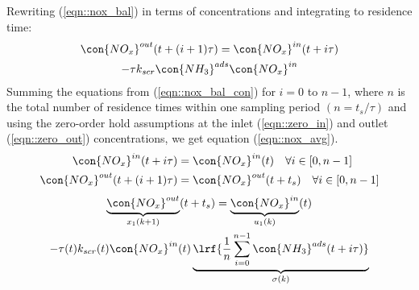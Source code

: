 Rewriting (\ref{eqn::nox_bal}) in terms of concentrations and integrating to residence time:
\begin{multline}
        \con{NO_x}^{out} (t + (i+1) \tau) =
                \con{NO_x}^{in} (t + i \tau) \\
                -\tau k_{scr} \con{NH_3}^{ads} \con{NO_x}^{in}
        \label{eqn::nox_bal_con}
\end{multline}
Summing the equations from (\ref{eqn::nox_bal_con}) for  $i = 0$ to $n-1$, where $n$ is the total number of residence times within one sampling period $(n= t_s/\tau)$ and using the zero-order hold assumptions at the inlet (\ref{eqn::zero_in}) and outlet (\ref{eqn::zero_out}) concentrations, we get equation (\ref{eqn::nox_avg}).
\begin{align}
    \con{NO_x}^{in} (t + i \tau) &= \con{NO_x}^{in}(t) \quad \forall i \in [0, n-1]  \label{eqn::zero_in}\\
    \con{NO_x}^{out} (t + (i+1) \tau) &= \con{NO_x}^{out}(t + t_s) \quad \forall i \in [0, n-1] \label{eqn::zero_out}
\end{align}
\begin{multline}
        \underbrace{\con{NO_x}^{out}}_{x_1(k+1)}(t+t_s) =
                \underbrace{\con{NO_x}^{in}}_{u_1(k)}(t) \\
                - \tau(t) k_{scr}(t) \con{NO_x}^{in}(t) \underbrace{\lrf{\frac{1}{n} \sum_{i = 0}^{n-1} \con{NH_3}^{ads}(t + i \tau)}}_{\sigma(k)}
        \label{eqn::nox_avg}
\end{multline}


